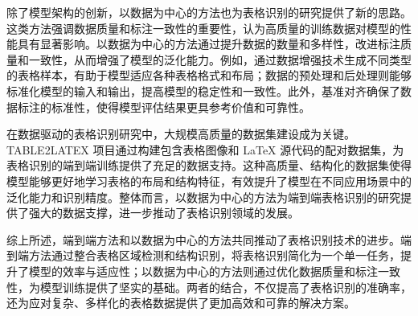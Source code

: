 \documentclass[number, UTF8,12pt, AutoFakeBold,fontset = founder]{ctexart}
\begin{document}
除了模型架构的创新，以数据为中心的方法也为表格识别的研究提供了新的思路。这类方法强调数据质量和标注一致性的重要性，认为高质量的训练数据对模型的性能具有显著影响。以数据为中心的方法通过提升数据的数量和多样性，改进标注质量和一致性，从而增强了模型的泛化能力。例如，通过数据增强技术生成不同类型的表格样本，有助于模型适应各种表格格式和布局；数据的预处理和后处理则能够标准化模型的输入和输出，提高模型的稳定性和一致性。此外，基准对齐确保了数据标注的标准性，使得模型评估结果更具参考价值和可靠性。

在数据驱动的表格识别研究中，大规模高质量的数据集建设成为关键。TABLE2LATEX 项目通过构建包含表格图像和 LaTeX 源代码的配对数据集，为表格识别的端到端训练提供了充足的数据支持。这种高质量、结构化的数据集使得模型能够更好地学习表格的布局和结构特征，有效提升了模型在不同应用场景中的泛化能力和识别精度。整体而言，以数据为中心的方法为端到端表格识别的研究提供了强大的数据支撑，进一步推动了表格识别领域的发展。

综上所述，端到端方法和以数据为中心的方法共同推动了表格识别技术的进步。端到端方法通过整合表格区域检测和结构识别，将表格识别简化为一个单一任务，提升了模型的效率与适应性；以数据为中心的方法则通过优化数据质量和标注一致性，为模型训练提供了坚实的基础。两者的结合，不仅提高了表格识别的准确率，还为应对复杂、多样化的表格数据提供了更加高效和可靠的解决方案。


\end{document}
